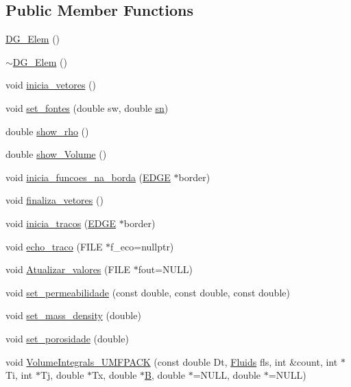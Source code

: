 \subsection*{Public Member Functions}
\begin{DoxyCompactItemize}
\item 
\hyperlink{classDG__Elem_a9f40328ca740050c165ccffe11007d35}{D\+G\+\_\+\+Elem} ()
\item 
\hyperlink{classDG__Elem_af37ff3dd87674abfdd621f8cdba43975}{$\sim$\+D\+G\+\_\+\+Elem} ()
\item 
void \hyperlink{classDG__Elem_ac1ec1f962d6e1852f0adb01048c4c1f9}{inicia\+\_\+vetores} ()
\item 
void \hyperlink{classDG__Elem_a9f7165dbb388e11f16b4249383f71d0e}{set\+\_\+fontes} (double sw, double \hyperlink{DG__EI__Header_8h_a52e510ecdc11d9091099d94c3ba63e74}{sn})
\item 
double \hyperlink{classDG__Elem_acc7285f0df1d6a4544405169daf2853c}{show\+\_\+rho} ()
\item 
double \hyperlink{classDG__Elem_a01a49e07fd18a74e12eedf15cff7b8c7}{show\+\_\+\+Volume} ()
\item 
void \hyperlink{classDG__Elem_af61130ab38851fa2ade53f9e3f2418bc}{inicia\+\_\+funcoes\+\_\+na\+\_\+borda} (\hyperlink{structEDGE}{E\+D\+GE} $\ast$border)
\item 
void \hyperlink{classDG__Elem_af91d2d61c97fae30b8dfc6db67433094}{finaliza\+\_\+vetores} ()
\item 
void \hyperlink{classDG__Elem_a33d01f96cc0d00b6a1a1d4a817724b4c}{inicia\+\_\+tracos} (\hyperlink{structEDGE}{E\+D\+GE} $\ast$border)
\item 
void \hyperlink{classDG__Elem_ab5d89b8f7625699239440bfd0e8ec6e6}{echo\+\_\+traco} (F\+I\+LE $\ast$f\+\_\+eco=nullptr)
\item 
void \hyperlink{classDG__Elem_a70dbc366e1cdfb0b96fa9d640dcff689}{Atualizar\+\_\+valores} (F\+I\+LE $\ast$fout=N\+U\+LL)
\item 
void \hyperlink{classDG__Elem_a51393e54786059782e6a0502f00cdd50}{set\+\_\+permeabilidade} (const double, const double, const double)
\item 
void \hyperlink{classDG__Elem_a132e9ad800e701395b1e21d291040ff2}{set\+\_\+mass\+\_\+density} (double)
\item 
void \hyperlink{classDG__Elem_a5d8512886cb22395c92265f5eee6a940}{set\+\_\+porosidade} (double)
\item 
void \hyperlink{classDG__Elem_ab3de164caf40da7cc0b123928ad83cc9}{Volume\+Integrals\+\_\+\+U\+M\+F\+P\+A\+CK} (const double Dt, \hyperlink{classFluids}{Fluids} fls, int \&count, int $\ast$Ti, int $\ast$Tj, double $\ast$Tx, double $\ast$\hyperlink{ASPFunctions_8cpp_a57d673f8d6833fb7a7aced326df10ca9}{B}, double $\ast$=N\+U\+LL, double $\ast$=N\+U\+LL)

\end{DoxyCompactItemize}
